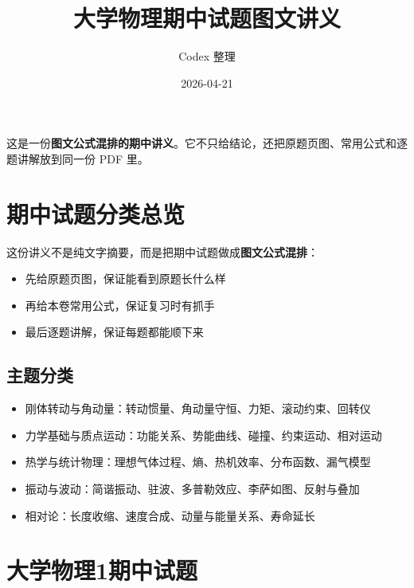 \documentclass[12pt,a4paper]{ctexart}
\title{大学物理期中试题图文讲义}
\author{Codex 整理}
\date{2026-04-21}
\begin{document}
\maketitle

\begin{tcolorbox}[title=讲义定位,colback=yellow!4!white,colframe=orange!60!black]
这是一份\textbf{图文公式混排的期中讲义}。它不只给结论，还把原题页图、常用公式和逐题讲解放到同一份 PDF 里。
\end{tcolorbox}

\tableofcontents
\clearpage


\section{期中试题分类总览}

\begin{tcolorbox}[title=这一份讲义怎么用,colback=green!3!white,colframe=green!45!black]
这份讲义不是纯文字摘要，而是把期中试题做成\textbf{图文公式混排}：
\begin{itemize}
\item 先给原题页图，保证能看到原题长什么样
\item 再给本卷常用公式，保证复习时有抓手
\item 最后逐题讲解，保证每题都能顺下来
\end{itemize}
\end{tcolorbox}

\subsection{主题分类}

\begin{itemize}
\item 刚体转动与角动量：转动惯量、角动量守恒、力矩、滚动约束、回转仪
\item 力学基础与质点运动：功能关系、势能曲线、碰撞、约束运动、相对运动
\item 热学与统计物理：理想气体过程、熵、热机效率、分布函数、漏气模型
\item 振动与波动：简谐振动、驻波、多普勒效应、李萨如图、反射与叠加
\item 相对论：长度收缩、速度合成、动量与能量关系、寿命延长
\end{itemize}


\clearpage

\section{大学物理1期中试题}
\end{document}
